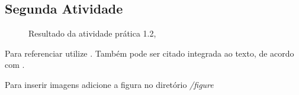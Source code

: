 \subsection{Segunda Atividade}\label{2atividae}



\begin{figure}[H] %
  \center
  \caption{Resultado da atividade prática 1.2, \cite{alguem2022nada}}\label{fig:ap1_cod_vigual1}
\end{figure}



Para referenciar utilize \cite{ninguem2022curioso}. Também pode ser citado integrada ao texto, de acordo com .

Para inserir imagens adicione a figura no diretório \textit{/figure}






